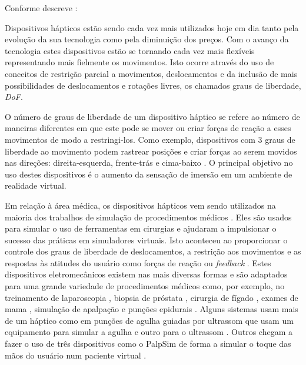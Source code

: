 Conforme descreve \textcite{Chen2022}:

\begin{quoting}[rightmargin=0cm,leftmargin=4cm] %
\begin{singlespace} %
{
\footnotesize %
Dispositivos hápticos estão sendo cada vez mais utilizados hoje em dia tanto pela evolução da sua tecnologia como pela diminuição dos preços. Com o avanço da tecnologia estes dispositivos estão se tornando cada vez mais flexíveis representando mais fielmente os movimentos. Isto ocorre  através do uso de conceitos de restrição parcial a movimentos, deslocamentos e da inclusão de mais possibilidades de deslocamentos e rotações livres, os chamados graus de liberdade, \textit{\acrfull{DoF}}.
}
\end{singlespace} %
\end{quoting} %

O número de graus de liberdade de um dispositivo háptico se refere ao número de maneiras diferentes em que este pode se mover ou criar forças de reação a esses movimentos de modo a restringi-los. Como exemplo, dispositivos com 3 graus de liberdade ao movimento podem rastrear posições e criar forças ao serem movidos nas direções: direita-esquerda, frente-trás e cima-baixo \cite{HAPTICSHOUSE2019}. O principal objetivo no uso destes dispositivos é o aumento da sensação de imersão em um ambiente de realidade virtual. 

Em relação à área médica, os dispositivos hápticos vem sendo utilizados na maioria dos trabalhos de simulação de procedimentos médicos \cite{Escobar-Castillejos2016, Moo-Young2021}. Eles são usados para simular o uso de ferramentas em cirurgias e ajudaram a impulsionar o sucesso das práticas em simuladores virtuais. Isto aconteceu ao proporcionar o controle dos graus de liberdade de deslocamentos, a restrição aos movimentos e as respostas às atitudes do usuário como forças de reação ou \textit{feedback} \cite{Gerovich2004}. Estes dispositivos eletromecânicos existem nas mais diversas formas e são adaptados para uma grande variedade de procedimentos médicos como, por exemplo, no treinamento de laparoscopia \cite{Srinivasan2004}, biopsia de próstata \cite{Sclaverano2009}, cirurgia de fígado \cite{Mastmeyer2016}, exames de mama \cite{Brazil2017,Jeon2010,Ribeiro2014,Solanki2010}, simulação de apalpação \cite{Ribeiro2016} e punções epidurais \cite{N.2013, Brazil2018}. Alguns sistemas usam mais de um háptico como em punções de agulha guiadas por ultrassom que usam um equipamento para simular a agulha e outro para o ultrassom \cite{Ni2011,Vidal2008}. Outros chegam a fazer o uso de três dispositivos como o PalpSim de forma a simular o toque das mãos do usuário num paciente virtual \cite{Coles2011b}. 

